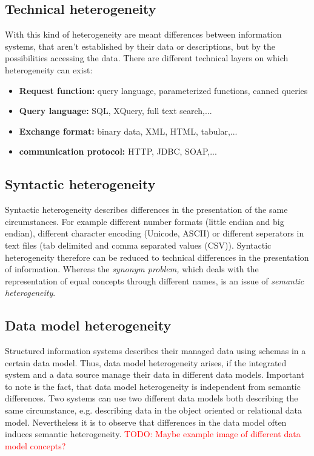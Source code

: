 \subsection{Technical  heterogeneity}
With this kind of heterogeneity are meant differences between information systems, that aren't established by their data or descriptions, but by the possibilities accessing the data. There are different technical layers on which heterogeneity can exist:
\begin{itemize}
\item \textbf{Request function:} query language, parameterized  functions, canned queries
\item \textbf{Query language:} SQL, XQuery, full text search,...
\item \textbf{Exchange format:} binary data, XML, HTML, tabular,...
\item \textbf{communication protocol:} HTTP, JDBC, SOAP,...
\end{itemize}
\subsection{Syntactic  heterogeneity}
Syntactic heterogeneity describes differences in the presentation of the same circumstances. For example different number formats (little endian and big endian), different character encoding (Unicode, ASCII) or different seperators in text files (tab delimited and comma separated values (CSV)). Syntactic heterogeneity therefore can be reduced to technical differences in the presentation of information. Whereas the \textit{synonym problem,} which deals with the representation of equal concepts through different names, is an issue of \textit{semantic heterogeneity}.
\subsection{Data model  heterogeneity}
Structured information systems describes their managed data using schemas in a certain data model. Thus, data model heterogeneity arises, if the integrated system and a data source manage their data in different data models. Important to note is the fact, that data model heterogeneity is independent from semantic differences. Two systems can use two different data models both describing the same circumstance, e.g. describing data in the object oriented or relational data model. Nevertheless it is to observe that differences in the data model often induces semantic heterogeneity.
\textcolor{red}{TODO: Maybe example image of different data model concepts?}

